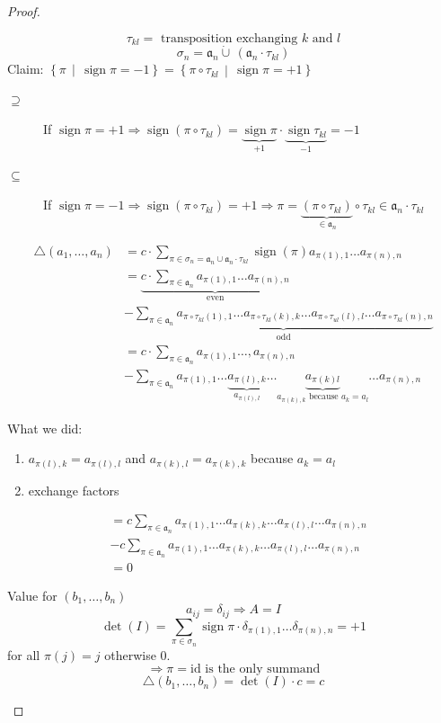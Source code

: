 \documentclass[a4paper,landscape,twocolumn]{article}
\newcommand\setdef[2]{\left\{#1\,\middle|\,#2\right\}}
\theoremstyle{definition}
\DeclareMathOperator\sign{sign}
\begin{document}
\begin{proof}
\begin{enumerate}
      \[ \tau_{kl} = \text{ transposition exchanging $k$ and $l$} \]
      \[ \sigma_n = \mathfrak a_n \dot\cup\, (\mathfrak a_n \cdot \tau_{kl}) \]
      Claim: $\setdef{\pi}{\sign{\pi} = -1} = \setdef{\pi \circ \tau_{kl}}{\sign{\pi} = +1}$
      \begin{description}
        \item[$\supseteq$] If $\sign{\pi} = +1 \Rightarrow \sign(\pi \circ \tau_{kl}) = \underbrace{\sign{\pi}}_{+1} \cdot \underbrace{\sign{\tau_{kl}}}_{-1} = -1$
        \item[$\subseteq$] If $\sign{\pi} = -1 \Rightarrow \sign(\pi \circ \tau_{kl}) = +1 \Rightarrow \pi = \underbrace{(\pi \circ \tau_{kl})}_{\in \mathfrak a_n} \circ \tau_{kl} \in \mathfrak a_n \cdot \tau_{kl}$
      \end{description}
      \begin{align*}
        \triangle(a_1, \ldots, a_n)
          &= c \cdot \sum_{\pi \in \sigma_n = \mathfrak a_n \cup \mathfrak a_n \cdot \tau_{kl}}
            \sign(\pi) a_{\pi(1),1} \ldots a_{\pi(n),n} \\
          &= \underbrace{c \cdot \sum_{\pi \in \mathfrak a_n} a_{\pi(1),1} \ldots a_{\pi(n),n}}_{\text{even}} \\
          &- \underbrace{\sum_{\pi \in \mathfrak a_n} a_{\pi \circ \tau_{kl}(1),1} \ldots a_{\pi \circ \tau_{kl}(k),k} \ldots a_{\pi \circ \tau_{ul}(l),l} \ldots a_{\pi \circ \tau_{kl}(n),n}}_{\text{odd}} \\
          &= c \cdot \sum_{\pi \in \mathfrak a_n} a_{\pi(1),1} \ldots, a_{\pi(n),n} \\
          &- \sum_{\pi \in \mathfrak a_n} a_{\pi(1),1} \ldots \underbrace{a_{\pi(l),k}}_{a_{\pi(l),l}} \ldots \underbrace{a_{\pi(k)l}}_{a_{\pi(k),k} \text{ because } a_k=a_l} \ldots a_{\pi(n),n}
      \end{align*}

      What we did:
      \begin{enumerate}
        \item $a_{\pi(l),k} = a_{\pi(l),l}$ and $a_{\pi(k),l} = a_{\pi(k),k}$ because $a_k = a_l$
        \item exchange factors
      \end{enumerate}

      \begin{align*}
        &= c \sum_{\pi \in \mathfrak a_n} a_{\pi(1),1} \ldots a_{\pi(k),k} \ldots a_{\pi(l),l} \ldots a_{\pi(n),n} \\
        &- c \sum_{\pi \in \mathfrak a_n} a_{\pi(1),1} \ldots a_{\pi(k),k} \ldots a_{\pi(l),l} \ldots a_{\pi(n),n} \\
        &= 0
      \end{align*}

      Value for $(b_1, \ldots, b_n)$
      \[ a_{ij} = \delta_{ij} \Rightarrow A = I \]
      \[ \det(I) = \sum_{\pi \in \sigma_n} \sign{\pi} \cdot \delta_{\pi(1),1} \ldots \delta_{\pi(n),n} = +1 \]
      for all $\pi(j)=j$ otherwise $0$.
      \[ \Rightarrow \pi = \text{id} \text{ is the only summand} \]
      \[ \triangle(b_1, \ldots, b_n) = \det(I) \cdot c = c \]
  \end{enumerate}
\end{proof}
\end{document}
